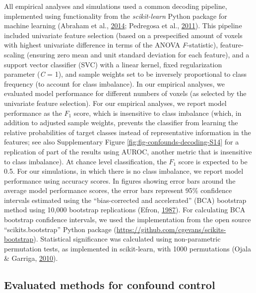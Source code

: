 \documentclass[12pt,american,a4paper,oneside,]{memoir} %
\begin{document}
All empirical analyses and simulations used a common decoding pipeline, implemented using functionality from the \emph{scikit-learn} Python package for machine learning (Abraham et al., \protect\hyperlink{ref-Abraham2014-ef}{2014}; Pedregosa et al., \protect\hyperlink{ref-pedregosa2011scikit}{2011}). This pipeline included univariate feature selection (based on a prespecified amount of voxels with highest univariate difference in terms of the ANOVA \emph{F}-statistic), feature-scaling (ensuring zero mean and unit standard deviation for each feature), and a support vector classifier (SVC) with a linear kernel, fixed regularization parameter (\emph{C} = 1), and sample weights set to be inversely proportional to class frequency (to account for class imbalance). In our empirical analyses, we evaluated model performance for different numbers of voxels (as selected by the univariate feature selection). For our empirical analyses, we report model performance as the \(F_{1}\) score, which is insensitive to class imbalance (which, in addition to adjusted sample weights, prevents the classifier from learning the relative probabilities of target classes instead of representative information in the features; see also Supplementary Figure \ref{fig:fig-confounds-decoding-S14} for a replication of part of the results using AUROC, another metric that is insensitive to class imbalance). At chance level classification, the \(F_{1}\) score is expected to be 0.5. For our simulations, in which there is no class imbalance, we report model performance using accuracy scores. In figures showing error bars around the average model performance scores, the error bars represent 95\% confidence intervals estimated using the ``bias-corrected and accelerated'' (BCA) bootstrap method using 10,000 bootstrap replications (Efron, \protect\hyperlink{ref-efron1987better}{1987}). For calculating BCA bootstrap confidence intervals, we used the implementation from the open source ``scikits.bootstrap'' Python package (\url{https://github.com/cgevans/scikits-bootstrap}). Statistical significance was calculated using non-parametric permutation tests, as implemented in scikit-learn, with 1000 permutations (Ojala \& Garriga, \protect\hyperlink{ref-Ojala2010-rc}{2010}).

\hypertarget{confounds-decoding-methods-evaluated-methods}{%
\subsection{Evaluated methods for confound control}\label{confounds-decoding-methods-evaluated-methods}}
\end{document}
